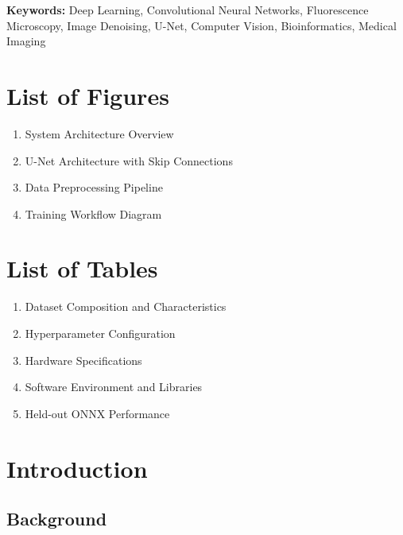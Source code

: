 \documentclass[12pt,a4paper]{report}
\begin{document}
\noindent \textbf{Keywords:} Deep Learning, Convolutional Neural Networks, Fluorescence Microscopy, Image Denoising, U-Net, Computer Vision, Bioinformatics, Medical Imaging

\tableofcontents
{}

\chapter*{List of Figures}
\thispagestyle{plain}

\begin{enumerate}
    \item System Architecture Overview \hfill \pageref{fig:architecture}
    \item U-Net Architecture with Skip Connections \hfill \pageref{fig:unet}
    \item Data Preprocessing Pipeline \hfill \pageref{fig:preprocessing}
    \item Training Workflow Diagram \hfill \pageref{fig:training}
\end{enumerate}

\chapter*{List of Tables}
\thispagestyle{plain}

\begin{enumerate}
    \item Dataset Composition and Characteristics \hfill \pageref{tab:dataset}
    \item Hyperparameter Configuration \hfill \pageref{tab:hyperparameters}
    \item Hardware Specifications \hfill \pageref{tab:hardware}
    \item Software Environment and Libraries \hfill \pageref{tab:software}
    \item Held-out ONNX Performance \hfill \pageref{tab:validated_metrics}
\end{enumerate}

\chapter{Introduction}
\label{chap:introduction}

\section{Background}
\end{document}

